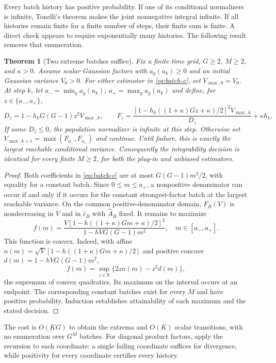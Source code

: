 \documentclass{article}
\newtheorem{theorem}{Theorem}
\newcommand{\R}{\mathbb R}
\begin{document}
Every batch history has positive probability. If one of its conditional normalizers is infinite, Tonelli's theorem makes the joint nonnegative integral infinite. If all histories remain finite for a finite number of steps, their finite sum is finite. A direct check appears to require exponentially many histories. The following result removes that enumeration.

\begin{theorem}[Two extreme batches suffice]\label{thm:extreme}
Fix a finite time grid, $G\ge2$, $M\ge2$, and $\kappa>0$. Assume scalar Gaussian factors with $a_g(u_k)\ge0$ and an initial Gaussian variance $V_0>0$. For either estimator in \eqref{eq:batch-c}, set $V_{\max,0}=V_0$. At step $k$, let $a_-=\min_g a_g(u_k)$, $a_+=\max_g a_g(u_k)$ and define, for $z\in\{a_-,a_+\}$,
\begin{equation}\label{eq:extreme-recursion}
 D_z=1-h_kG(G-1)z^2V_{\max,k},\qquad
 F_z=\frac{[1-h_k((1+\kappa)Gz+\kappa)/2]^2V_{\max,k}}{D_z}+\kappa h_k.
\end{equation}
If some $D_z\le0$, the population normalizer is infinite at this step. Otherwise set $V_{\max,k+1}=\max(F_{a_-},F_{a_+})$ and continue. Until failure, this is exactly the largest reachable conditional variance. Consequently the integrability decision is identical for every finite $M\ge2$, for both the plug-in and unbiased estimators.
\end{theorem}
\begin{proof}
Both coefficients in \eqref{eq:batch-c} are at most $G(G-1)m^2/2$, with equality for a constant batch. Since $0\le m\le a_+$, a nonpositive denominator can occur if and only if it occurs for the constant strongest-factor batch at the largest reachable variance. On the common positive-denominator domain, $F_B(V)$ is nondecreasing in $V$ and in $\widehat c_B$ with $\widehat A_B$ fixed. It remains to maximize
\[
 f(m)=\frac{V[1-h((1+\kappa)Gm+\kappa)/2]^2}{1-hVG(G-1)m^2},\quad m\in[a_-,a_+].
\]
This function is convex. Indeed, with affine $n(m)=\sqrt V[1-h((1+\kappa)Gm+\kappa)/2]$ and positive concave $d(m)=1-hVG(G-1)m^2$,
\[
 f(m)=\sup_{z\in\R}\{2zn(m)-z^2d(m)\},
\]
the supremum of convex quadratics. Its maximum on the interval occurs at an endpoint. The corresponding constant batches exist for every $M$ and have positive probability. Induction establishes attainability of each maximum and the stated decision.
\end{proof}

The cost is $O(KG)$ to obtain the extrema and $O(K)$ scalar transitions, with no enumeration over $G^M$ batches. For diagonal product factors, apply the recursion to each coordinate: a single failing coordinate suffices for divergence, while positivity for every coordinate certifies every history.
\end{document}
